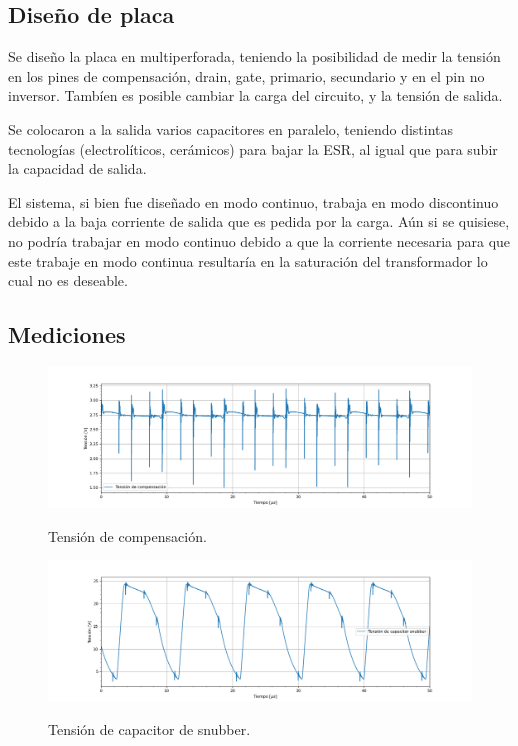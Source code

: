 %
%
%

\subsection{Diseño de placa}
Se diseño la placa en multiperforada, teniendo la posibilidad de medir la tensión en los pines de compensación, drain, gate, primario, secundario y en el pin no inversor. Tambíen es posible cambiar la carga del circuito, y la tensión de salida.

Se colocaron a la salida varios capacitores en paralelo, teniendo distintas tecnologías (electrolíticos, cerámicos) para bajar la ESR, al igual que para subir la capacidad de salida. 

El sistema, si bien fue diseñado en modo continuo, trabaja en modo discontinuo debido a la baja corriente de salida que es pedida por la carga. Aún si se quisiese, no podría trabajar en modo continuo debido a que la corriente necesaria para que este trabaje en modo continua resultaría en la saturación del transformador lo cual no es deseable.

\subsection{Mediciones}

\begin{figure}[H]
	\centering
	\includegraphics[width=0.9\linewidth]{ImagenesParteIV/Vcom.png}
	\label{fig:vcom_4}
	\caption{Tensión de compensación.}
\end{figure}

\begin{figure}[H]
	\centering
	\includegraphics[width=0.9\linewidth]{ImagenesParteIV/Vcsnubber.png}
	\label{fig:vcsnubb_4}
	\caption{Tensión de capacitor de snubber.}
\end{figure}

